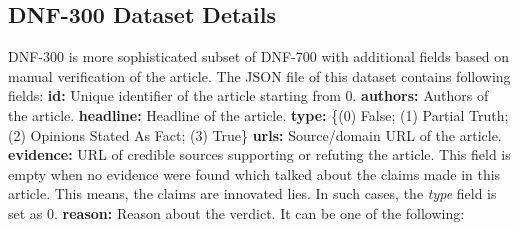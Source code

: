 \documentclass[11pt,a4paper]{article}
\begin{document}
\subsection{DNF-300 Dataset Details} 
\label{sect:300dataset}
DNF-300 is more sophisticated subset of DNF-700 with additional fields based on manual verification of the article. The JSON file of this dataset contains following fields:\newline \newline
\textbf{id:} Unique identifier of the article starting from 0.\newline
\textbf{authors:} Authors of the article.\newline
\textbf{headline:} Headline of the article. \newline
\textbf{type:} \{(0) False; (1) Partial Truth; (2) Opinions Stated As Fact; (3) True\}  \newline
\textbf{urls:} Source/domain URL of the article. \newline
\textbf{evidence:} URL of credible sources supporting or refuting the article. This field is empty when no evidence were found which talked about the claims made in this article. This means, the claims are innovated lies. In such cases, the \textit{type} field is set as 0. \newline
\textbf{reason:} Reason about the verdict. It can be one of the following:
\end{document}
